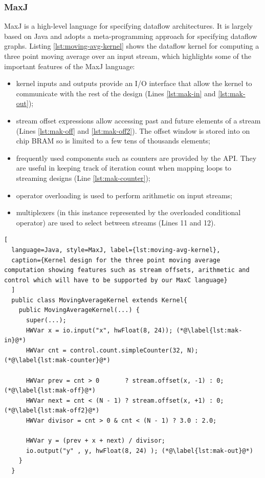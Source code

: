 \subsubsection{MaxJ}

MaxJ is a high-level language for specifying dataflow
architectures. It is largely based on Java and adopts a
meta-programming approach for specifying dataflow graphs.  Listing
\ref{lst:moving-avg-kernel} shows the dataflow kernel for computing a
three point moving average over an input stream, which highlights some
of the important features of the MaxJ language:

\begin{itemize}

\item kernel inputs and outputs provide an I/O interface that allow
  the kernel to communicate with the rest of the design (Lines
  \ref{lst:mak-in} and \ref{lst:mak-out});

\item stream offset expressions allow accessing past and future
  elements of a stream (Lines \ref{lst:mak-off} and
  \ref{lst:mak-off2}). The offset window is stored into on chip BRAM
  so is limited to a few tens of thousands elements;

\item frequently used components such as counters are provided by the
  API. They are useful in keeping track of iteration count when
  mapping loops to streaming designs (Line \ref{lst:mak-counter});

\item operator overloading is used to perform arithmetic on input streams;

\item multiplexers (in this instance represented by the overloaded
  conditional operator) are used to select between streams (Lines 11
  and 12).

\end{itemize}

\begin{lstlisting}[
  language=Java, style=MaxJ, label={lst:moving-avg-kernel},
  caption={Kernel design for the three point moving average computation showing features such as stream offsets, arithmetic and control which will have to be supported by our MaxC language}
  ]
  public class MovingAverageKernel extends Kernel{
    public MovingAverageKernel(...) {
      super(...);
      HWVar x = io.input("x", hwFloat(8, 24)); (*@\label{lst:mak-in}@*)
      HWVar cnt = control.count.simpleCounter(32, N); (*@\label{lst:mak-counter}@*)

      HWVar prev = cnt > 0       ? stream.offset(x, -1) : 0; (*@\label{lst:mak-off}@*)
      HWVar next = cnt < (N - 1) ? stream.offset(x, +1) : 0; (*@\label{lst:mak-off2}@*)
      HWVar divisor = cnt > 0 & cnt < (N - 1) ? 3.0 : 2.0;

      HWVar y = (prev + x + next) / divisor;
      io.output("y" , y, hwFloat(8, 24) ); (*@\label{lst:mak-out}@*)
    }
  }
\end{lstlisting}

